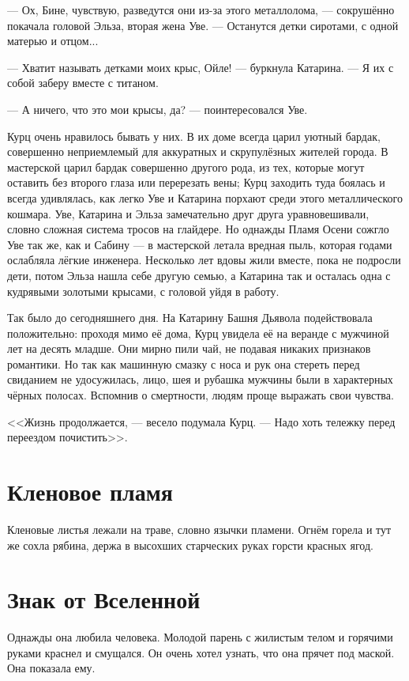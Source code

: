 \documentclass[a4paper,10pt,fleqn]{book}\usepackage{polyglossia}\setdefaultlanguage{english}\setotherlanguage{russian}\defaultfontfeatures{Ligatures=TeX,Mapping=tex-text}\usepackage{xcolor}\definecolor{lightgray}{HTML}{bbbbbb}\color{lightgray}\newcommand{\ml}[3]{\textcolor{black}{#3}}
\begin{document}
--- Ох, Бине, чувствую, разведутся они из-за этого металлолома, --- сокрушённо покачала головой Эльза, вторая жена Уве.
--- Останутся детки сиротами, с одной матерью и отцом...

--- Хватит называть детками моих крыс, Ойле! --- буркнула Катарина. %
--- Я их с собой заберу вместе с титаном.

--- А ничего, что это мои крысы, да? --- поинтересовался Уве.

Курц очень нравилось бывать у них.
В их доме всегда царил уютный бардак, совершенно неприемлемый для аккуратных и скрупулёзных жителей города.
В мастерской царил бардак совершенно другого рода, из тех, которые могут оставить без второго глаза или перерезать вены;
Курц заходить туда боялась и всегда удивлялась, как легко Уве и Катарина порхают среди этого металлического кошмара.
Уве, Катарина и Эльза замечательно друг друга уравновешивали, словно сложная система тросов на глайдере.
Но однажды Пламя Осени сожгло Уве так же, как и Сабину --- в мастерской летала вредная пыль, которая годами ослабляла лёгкие инженера.
Несколько лет вдовы жили вместе, пока не подросли дети, потом Эльза нашла себе другую семью, а Катарина так и осталась одна с кудрявыми золотыми крысами, с головой уйдя в работу.

Так было до сегодняшнего дня.
На Катарину Башня Дьявола подействовала положительно: проходя мимо её дома, Курц увидела её на веранде с мужчиной лет на десять младше.
Они мирно пили чай, не подавая никаких признаков романтики.
Но так как машинную смазку с носа и рук она стереть перед свиданием не удосужилась, лицо, шея и рубашка мужчины были в характерных чёрных полосах.
Вспомнив о смертности, людям проще выражать свои чувства.

<<Жизнь продолжается, --- весело подумала Курц.
--- Надо хоть тележку перед переездом почистить>>.

\section{Кленовое пламя}

Кленовые листья лежали на траве, словно язычки пламени.
Огнём горела и тут же сохла рябина, держа в высохших старческих руках горсти красных ягод.

\section{Знак от Вселенной}

Однажды она любила человека.
Молодой парень с жилистым телом и горячими руками краснел и смущался.
Он очень хотел узнать, что она прячет под маской.
Она показала ему.
\end{document}

